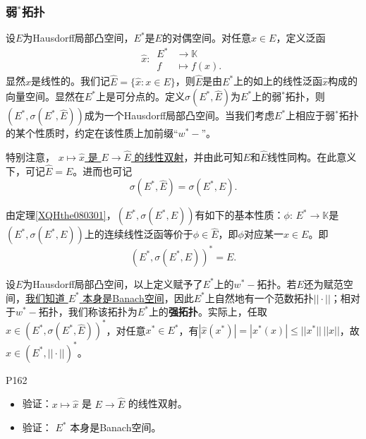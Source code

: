 \subsubsection{弱$\!\!^{*}\!\!$拓扑}
\original
{设$E$为Hausdorff局部凸空间，$E^{*}$是$E$的对偶空间。对任意$x\in E$，定义泛函
\begin{equation*}
	\hat{x}:\,
	\begin{aligned}
	E^{*}&\rightarrow \mathbb{K}\\
	f&\mapsto f(x).
	\end{aligned}
\end{equation*}
显然$\hat{x}$是线性的。我们记$\hat{E}=\{\hat{x}:x\in E\}$，则$\hat{E}$是由$E^{*}$上的如上的线性泛函$\hat{x}$构成的向量空间。显然在$E^{*}$上是可分点的。定义$\sigma(E^{*},\hat{E})$为$E^{*}$上的弱$\!\!^{*}\!\!$拓扑，则$(E^{*},\sigma(E^{*},\hat{E}))$成为一个Hausdorff局部凸空间。当我们考虑$E^{*}$上相应于弱$\!\!^{*}\!\!$拓扑的某个性质时，约定在该性质上加前缀“$w^{*}-$”。
\par
特别注意， \uline{$x\mapsto\hat{x}$ 是 $E\rightarrow \hat{E}$ 的线性双射}，并由此可知$E$和$\hat{E}$线性同构。在此意义下，可记$\hat{E}=E$。进而也可记
\begin{equation*}
	\sigma(E^{*},\hat{E})=\sigma(E^{*},E).
\end{equation*}
\par
由定理\ref{XQHthe080301}，$(E^{*},\sigma(E^{*},E))$有如下的基本性质：$\phi:\,E^{*}\rightarrow\mathbb{K}$是$(E^{*},\sigma(E^{*},E))$上的连续线性泛函等价于$\phi\in \hat{E}$，即$\phi$对应某一$x\in E$。即
\begin{equation*}
	(E^{*},\sigma(E^{*},E))^{*}=E.
\end{equation*}
\par
设$E$为Hausdorff局部凸空间，以上定义赋予了$E^{*}$上的$w^{*}-$拓扑。若$E$还为赋范空间，\uline{我们知道 $E^{*}$ 本身是Banach空间}，因此$E^{*}$上自然地有一个范数拓扑$||\cdot||$；相对于$w^{*}-$拓扑，我们称该拓扑为$E^{*}$上的\textbf{强拓扑}。实际上，任取$\hat{x}\in (E^{*},\sigma(E^{*},\hat{E}))^{*}$，对任意$x^{*}\in E^{*}$，有$|\hat{x}(x^{*})|=|x^{*}(x)|\leq ||x^{*}||\,||x||$，故$\hat{x}\in (E^{*},||\cdot||)^{*}$。

}
{P162}

\begin{proposition}
	\begin{itemize}
		\item 验证：$x\mapsto\hat{x}$ 是 $E\rightarrow \hat{E}$ 的线性双射。
		\item 验证： $E^{*}$ 本身是Banach空间。
	\end{itemize}
\end{proposition}

